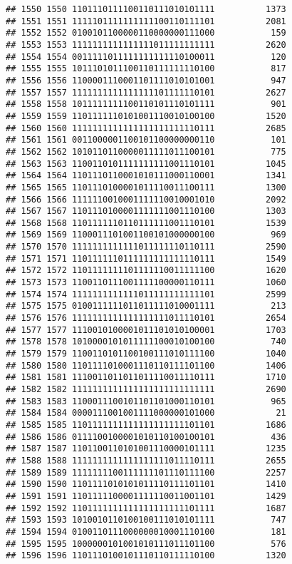 \documentclass[]{article}
\begin{document}
\begin{verbatim}
## 1550 1550 1101110111100110111010101111          1373
## 1551 1551 1111101111111111100110111101          2081
## 1552 1552 0100101100000110000000111000           159
## 1553 1553 1111111111111111011111111111          2620
## 1554 1554 0011111011111111111110100011           120
## 1555 1555 1011101011100110111111110100           817
## 1556 1556 1100001110001101111010101001           947
## 1557 1557 1111111111111111101111110101          2627
## 1558 1558 1011111111100110101110101111           901
## 1559 1559 1101111110101001110010100100          1520
## 1560 1560 1111111111111111111111110111          2685
## 1561 1561 0011000001100101100000000110           101
## 1562 1562 1010110110000011111011100101           775
## 1563 1563 1100110101111111111001110101          1045
## 1564 1564 1101110110001010111000110001          1341
## 1565 1565 1101110100001011110011100111          1300
## 1566 1566 1111110010001111110010001010          2092
## 1567 1567 1101110100001111111001110100          1303
## 1568 1568 1101111110110111111001110101          1539
## 1569 1569 1100011101001100101000000100           969
## 1570 1570 1111111111111011111110110111          2590
## 1571 1571 1101111110111111111111110111          1549
## 1572 1572 1101111111101111110011111100          1620
## 1573 1573 1100110111001111100000110111          1060
## 1574 1574 1111111111111011111111111101          2599
## 1575 1575 0100111111011011111010001111           213
## 1576 1576 1111111111111111111011110101          2654
## 1577 1577 1110010100001011101010100001          1703
## 1578 1578 1010000101011111100010100100           740
## 1579 1579 1100110101100100111010111100          1040
## 1580 1580 1101111010001110110111101100          1406
## 1581 1581 1110011011011011110011110111          1710
## 1582 1582 1111111111111111111111111111          2690
## 1583 1583 1100011100101101101000110101           965
## 1584 1584 0000111001001111000000101000            21
## 1585 1585 1101111111111111111111101101          1686
## 1586 1586 0111100100001010110100100101           436
## 1587 1587 1101100110101001110000101111          1235
## 1588 1588 1111111111111111111011110111          2655
## 1589 1589 1111111100111111101110111100          2257
## 1590 1590 1101111010101011110111101101          1410
## 1591 1591 1101111100001111110011001101          1429
## 1592 1592 1101111111111111111111101111          1687
## 1593 1593 1010010110100100111010101111           747
## 1594 1594 0100110111000000010001110100           181
## 1595 1595 1000000101001010111011101100           576
## 1596 1596 1101110100101110110111110100          1320

\end{verbatim}
\end{document}
